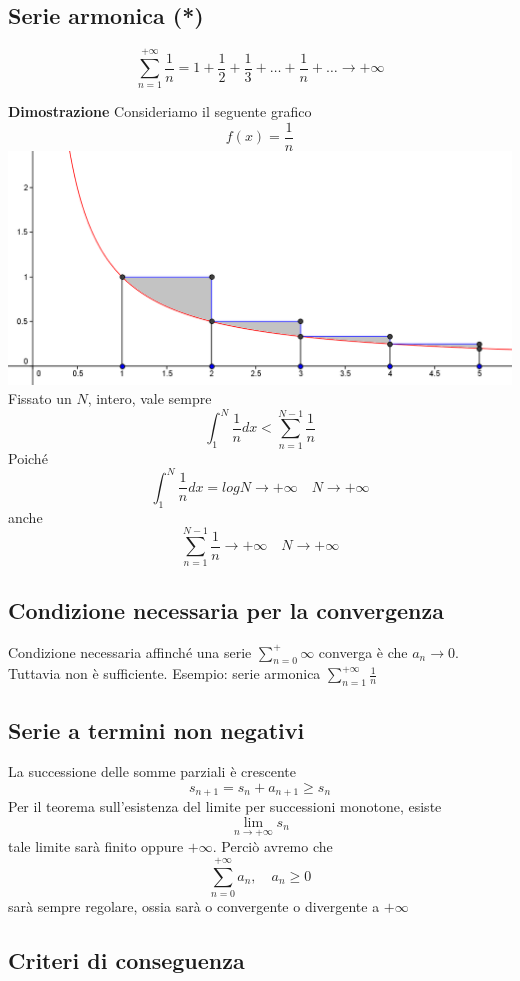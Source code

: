 \documentclass[12pt]{article}
\begin{document}
\subsection{Serie armonica (*)}
\[ \sum_{n=1}^{+\infty} \frac{1}{n} = 1 + \frac{1}{2} + \frac{1}{3} + \dots + \frac{1}{n} + \dots \to +\infty \]

\textbf{Dimostrazione}\newline
Consideriamo il seguente grafico
\[ f(x) = \frac{1}{n} \]
\includegraphics[width=\textwidth]{images/armonica.png}
Fissato un \(N\), intero, vale sempre 
\[ \int_1^N \frac{1}{n} dx  < \sum_{n=1}^{N-1} \frac{1}{n}\]
Poiché
\[ \int_1^N \frac{1}{n} dx = logN \to +\infty \quad N\to +\infty \]
anche
\[  \sum_{n=1}^{N-1} \frac{1}{n} \to +\infty \quad N \to +\infty \]

\subsection{Condizione necessaria per la convergenza}
Condizione necessaria affinché una serie \(\displaystyle \sum_{n=0}^+\infty\)
converga è che \( a_n \to 0\). Tuttavia non è sufficiente. Esempio: serie armonica \(\displaystyle \sum_{n=1}^{+\infty} \frac{1}{n}\)

\subsection{Serie a termini non negativi}
La successione delle somme parziali è crescente
\[
s_{n+1} = s_n + a_{n+1} \geq s_n
\]
Per il teorema sull'esistenza del limite per successioni monotone, esiste 
\[
\lim_{n \to +\infty} s_n
\]
tale limite sarà finito oppure $+\infty$. Perciò avremo che
\[
\sum_{n=0}^{+\infty} a_n, \quad a_n \geq 0
\]
sarà sempre regolare, ossia sarà o convergente o divergente a $+\infty$

\subsection{Criteri di conseguenza}
\end{document}

